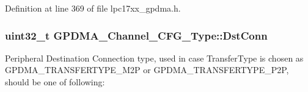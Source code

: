 \-Definition at line 369 of file lpc17xx\-\_\-gpdma.\-h.

\hypertarget{struct_g_p_d_m_a___channel___c_f_g___type_a98809e20455f460ac2b481595b189102}{
\subsubsection[{\-Dst\-Conn}]{\setlength{\rightskip}{0pt plus 5cm}uint32\-\_\-t {\bf \-G\-P\-D\-M\-A\-\_\-\-Channel\-\_\-\-C\-F\-G\-\_\-\-Type\-::\-Dst\-Conn}}}\label{struct_g_p_d_m_a___channel___c_f_g___type_a98809e20455f460ac2b481595b189102}
\-Peripheral \-Destination \-Connection type, used in case \-Transfer\-Type is chosen as \-G\-P\-D\-M\-A\-\_\-\-T\-R\-A\-N\-S\-F\-E\-R\-T\-Y\-P\-E\-\_\-\-M2\-P or \-G\-P\-D\-M\-A\-\_\-\-T\-R\-A\-N\-S\-F\-E\-R\-T\-Y\-P\-E\-\_\-\-P2\-P, should be one of following\-:

